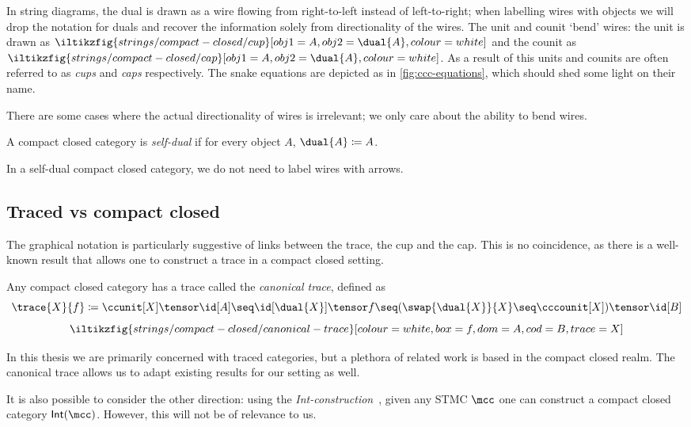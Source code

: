 In string diagrams, the dual is drawn as a wire flowing from right-to-left
instead of left-to-right; when labelling wires with objects we will drop the
notation for duals and recover the information solely from directionality of the
wires.
The unit and counit `bend' wires: the unit is drawn as \(
\iltikzfig{strings/compact-closed/cup}[obj1=A,obj2=\dual{A},colour=white]
\) and the counit as \(
\iltikzfig{strings/compact-closed/cap}[obj1=A,obj2=\dual{A},colour=white]
\).
As a result of this units and counits are often referred to as \emph{cups} and
\emph{caps} respectively.
The snake equations are depicted as in \cref{fig:ccc-equations}, which
should shed some light on their name.



There are some cases where the actual directionality of wires is irrelevant;
we only care about the ability to bend wires.

\begin{definition}
    A compact closed category is \emph{self-dual} if for every object \(A\),
    \(\dual{A} \coloneqq A\).
\end{definition}

In a self-dual compact closed category, we do not need to label wires with
arrows.

\subsection{Traced vs compact closed}

The graphical notation is particularly suggestive of links between the
trace, the cup and the cap.
This is no coincidence, as there is a well-known result that allows one to
construct a trace in a compact closed setting.

\begin{proposition}
    \label{prop:canonical-trace}
    Any compact closed category has a trace called the \emph{canonical trace},
    defined as \[
        \trace{X}{f}
        \coloneqq
        \ccunit[X] \tensor \id[A]
        \seq
        \id[\dual{X}] \tensor f
        \seq
        (\swap{\dual{X}}{X} \seq \cccounit[X]) \tensor \id[B]
    \]
    \[
        \iltikzfig{strings/compact-closed/canonical-trace}[colour=white,box=f,dom=A,cod=B,trace=X]
    \]
\end{proposition}

In this thesis we are primarily concerned with traced categories, but a plethora
of related work is based in the compact closed realm.
The canonical trace allows us to adapt existing results for our setting as well.

\begin{remark}
    It is also possible to consider the other direction: using the
    \emph{Int-construction}~\cite{joyal1996traced}, given any STMC
    \(\mcc\) one can construct a compact closed category \(\mathsf{Int}(\mcc)\).
    However, this will not be of relevance to us.
\end{remark}